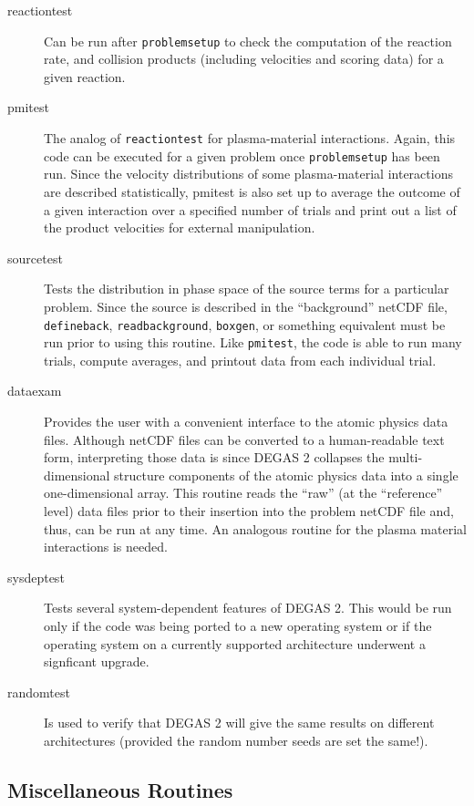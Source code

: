 \documentclass[12pt]{report}
\begin{document}
\begin{description}
\item[reactiontest] Can be run after {\tt problemsetup} 
to check the computation
of the reaction rate, and collision products (including velocities and
scoring data) for a given reaction.
\item[pmitest] The analog of {\tt reactiontest} for plasma-material
interactions. Again, this code can be executed for a given problem once
{\tt problemsetup} has been run. Since the velocity distributions of some
plasma-material interactions are described statistically, pmitest
is also set up to average the outcome of a given interaction over a
specified number of trials and print out a list of the product velocities
for external manipulation.
\item[sourcetest] Tests the distribution in phase space of the source
terms for a particular problem. Since the source is described in the 
``background'' netCDF file, {\tt defineback}, 
{\tt readbackground}, {\tt boxgen}, or something equivalent
must be run prior to using this routine. Like {\tt pmitest}, the code is able
to run many trials, compute averages, and printout data from each 
individual trial.
\item[dataexam] Provides the user with a convenient interface to the
atomic physics data files. Although netCDF files can be converted to
a human-readable text form, interpreting those data is since DEGAS 2
collapses the multi-dimensional structure components of the atomic physics data
into a single one-dimensional array. This routine reads the ``raw'' (at
the ``reference'' level) data files prior to their insertion into the
problem netCDF file and, thus, can be run at any time. An analogous
routine for the plasma material interactions is needed.
\item[sysdeptest] Tests several system-dependent features of DEGAS 2.
This would be run only if the code was being ported to a new operating
system or if the operating system on a currently supported architecture
underwent a signficant upgrade.
\item[randomtest] Is used to verify that DEGAS 2 will give the same 
results on 
different architectures (provided the random number seeds are set the
same!). 
\end{description}

\subsection{Miscellaneous Routines}
\label{miscroutines}
\end{document}
